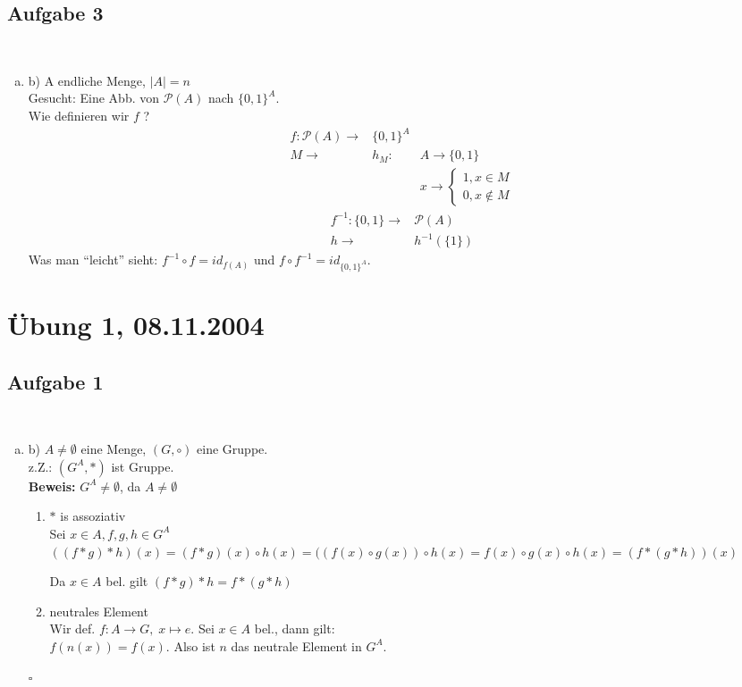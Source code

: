 \documentclass[a4paper,twoside,DIV15,BCOR12mm]{scrbook}
\newcommand{\enue}{\ \begin{enumerate}[(1)]}
\newcommand{\enua}{\ \begin{enumerate}[a)]}
\newcommand{\une}{\end{enumerate}}
\newenvironment{bew}{\pagebreak[2]\textbf{Beweis: }}{\qed}
\renewcommand{\qed}{\hspace*{\fill} \ensuremath{\square}}
\begin{document}
\subsection{Aufgabe 3}
\enua
\item[b)]
A endliche Menge, $|A| =n$\\
Gesucht: Eine Abb. von $\mathcal{P}(A)$ nach $\{0,1\}^A$.\\
Wie definieren wir $f$ ?
\begin{eqnarray*}
f: \mathcal{P}(A)\to & \{0,1\}^A & \\
M\to & h_M: & A\to\{0,1\}\\
& & x\to \left\{\begin{array}{rcc}1, x\in M\\0, x\not\in M\end{array}\right.
\end{eqnarray*}
\begin{eqnarray*}
f^{-1}:\{0,1\}\to & \mathcal{P}(A)\\
h \to & h^{-1}(\{1\})
\end{eqnarray*}
Was man "`leicht"' sieht: $f^{-1}\circ f = id_{f(A)}$ und $f\circ f^{-1}=id_{\{0,1\}^A}$.
\une 

\section{Übung 1, 08.11.2004}

\subsection {Aufgabe 1}
\enua
\item[b)]
$A\neq\emptyset$ eine Menge, $(G,\circ)$ eine Gruppe.\\
z.Z.: $(G^A,\ast)$ ist Gruppe.\\
\begin{bew}$G^A\neq\emptyset$, da $A\neq\emptyset$
\enue
  \item $\ast$ is assoziativ\\
    Sei $x\in A, f,g,h \in G^A$\\
    $((f\ast g)\ast h)(x)=(f\ast g)(x)\circ h(x)=((f(x)\circ g(x))\circ h(x)=f(x)\circ g(x)\circ h(x)=(f\ast(g\ast h))(x)$\par
    Da $x\in A$ bel. gilt $(f\ast g)\ast h=f\ast(g\ast h)$
  \item neutrales Element\\
    Wir def. $f: A\to G,\; x \mapsto e$. Sei $x \in A$ bel., dann gilt:\\
    $f(n(x))=f(x)$. Also ist $n$ das neutrale Element in $G^A$.
\une
\end{bew}
\une
\end{document}
